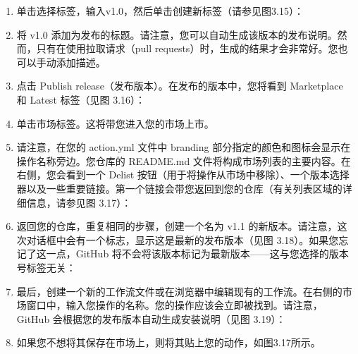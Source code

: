 \begin{enumerate}
\item 
单击选择标签，输入v1.0，然后单击创建新标签（请参见图3.15）：


\item 
将 v1.0 添加为发布的标题。请注意，您可以自动生成该版本的发布说明。然而，只有在使用拉取请求（pull requests）时，生成的结果才会非常好。您也可以手动添加描述。

\item 
点击 Publish release（发布版本）。在发布的版本中，您将看到 Marketplace 和 Latest 标签（见图 3.16）：


\item 
单击市场标签。这将带您进入您的市场上市。

\item 
请注意，在您的 action.yml 文件中 branding 部分指定的颜色和图标会显示在操作名称旁边。您仓库的 README.md 文件将构成市场列表的主要内容。在右侧，您会看到一个 Delist 按钮（用于将操作从市场中移除）、一个版本选择器以及一些重要链接。第一个链接会带您返回到您的仓库（有关列表区域的详细信息，请参见图 3.17）：


\item 
返回您的仓库，重复相同的步骤，创建一个名为 v1.1 的新版本。请注意，这次对话框中会有一个标志，显示这是最新的发布版本（见图 3.18）。如果您忘记了这一点，GitHub 将不会将该版本标记为最新版本——这与您选择的版本号标签无关：


\item 
最后，创建一个新的工作流文件或在浏览器中编辑现有的工作流。在右侧的市场窗口中，输入您操作的名称。您的操作应该会立即被找到。请注意，GitHub 会根据您的发布版本自动生成安装说明（见图 3.19）：


\item 
如果您不想将其保存在市场上，则将其贴上您的动作，如图3.17所示。
\end{enumerate}


